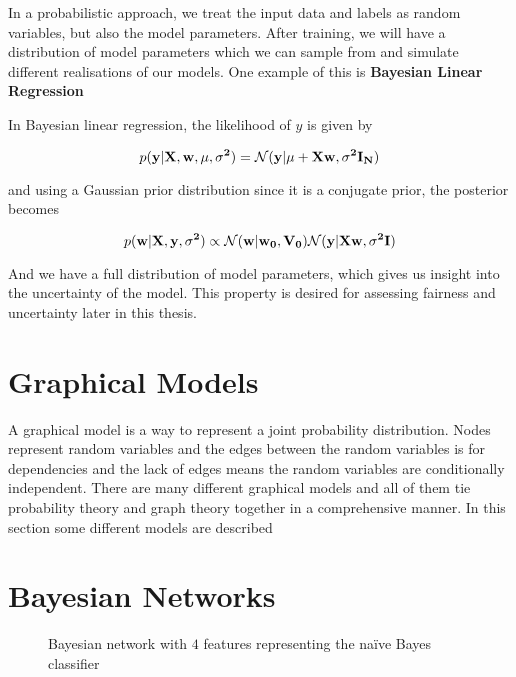 In a probabilistic approach, we treat the input data and labels as random variables, but also the model parameters. After training, we will have a distribution of model parameters which we can sample from and simulate different realisations of our models. One example of this is \textbf{Bayesian Linear Regression}

In Bayesian linear regression, the likelihood of $y$ is given by \cite[p.~232]{Murphy:2012:Book}

\begin{equation*}
    p(\bf{y}|\bf{X}, \bf{w}, \mu, \sigma^2) = \mathcal{N}(\bf{y}|\mu + \bf{X}\bf{w}, \sigma^2 \bf{I}_N)
\end{equation*}

and using a Gaussian prior distribution since it is a conjugate prior, the posterior becomes \cite[p.~232]{Murphy:2012:Book}

\begin{equation*}
    p(\bf{w}|\bf{X}, \bf{y}, \sigma^2) \propto \mathcal{N}(\bf{w}|\bf{w_0}, \bf{V_0}) \mathcal{N}(\bf{y}|\bf{Xw}, \sigma^2\bf{I})
\end{equation*}

And we have a full distribution of model parameters, which gives us insight into the uncertainty of the model. This property is desired for assessing fairness and uncertainty later in this thesis.

\section{Graphical Models}

A graphical model is a way to represent a joint probability distribution. Nodes represent random variables and the edges between the random variables is for dependencies and the lack of edges means the random variables are conditionally independent. \cite[p.~308]{Murphy:2012:Book} There are many different graphical models and all of them tie probability theory and graph theory together in a comprehensive manner. In this section some different models are described

\section{Bayesian Networks}

\begin{figure}[h!]
    \centering
    \caption{Bayesian network with $4$ features representing the naïve Bayes classifier}
    \label{fig:my_label}
\end{figure}


